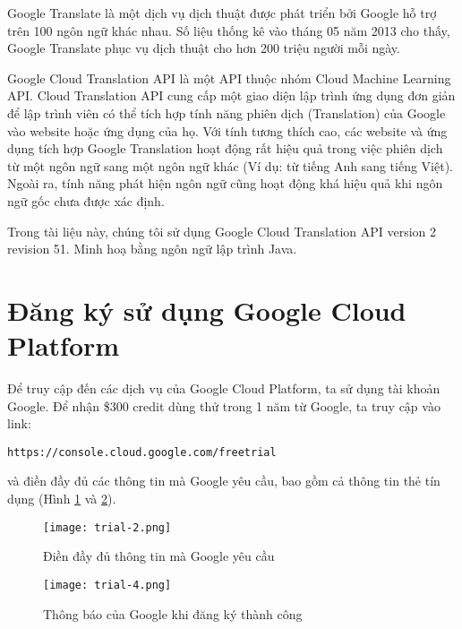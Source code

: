 \documentclass[../thesis.tex]{subfiles}
\begin{document}

Google Translate là một dịch vụ dịch thuật được phát triển bởi Google hỗ trợ trên 100 ngôn ngữ khác nhau. Số liệu thống kê vào tháng 05 năm 2013 cho thấy, Google Translate phục vụ dịch thuật cho hơn 200 triệu người mỗi ngày.

Google Cloud Translation API là một API thuộc nhóm Cloud Machine Learning API. Cloud Translation API cung cấp một giao diện lập trình ứng dụng đơn giản để lập trình viên có thể tích hợp tính năng phiên dịch (Translation) của Google vào website hoặc ứng dụng của họ. Với tính tương thích cao, các website và ứng dụng tích hợp Google Translation hoạt động rất hiệu quả trong việc phiên dịch từ một ngôn ngữ sang một ngôn ngữ khác (Ví dụ: từ tiếng Anh sang tiếng Việt). Ngoài ra, tính năng phát hiện ngôn ngữ cũng hoạt động khá hiệu quả khi ngôn ngữ gốc chưa được xác định.

Trong tài liệu này, chúng tôi sử dụng Google Cloud Translation API version 2 revision 51. Minh hoạ bằng ngôn ngữ lập trình Java. 

\section{Đăng ký sử dụng Google Cloud Platform}

Để truy cập đến các dịch vụ của Google Cloud Platform, ta sử dụng tài khoản Google. Để nhận \$300 credit dùng thử trong 1 năm từ Google, ta truy cập vào link:
\begin{lstlisting}[style=link]
https://console.cloud.google.com/freetrial
\end{lstlisting}
và điền đầy đủ các thông tin mà Google yêu cầu, bao gồm cả thông tin thẻ tín dụng (Hình \ref{Dien day du thong tin ma Google yeu cau} và \ref{Thong bao cua Google khi dang ky thanh cong}).

\begin{figure}
	\texttt{[image: trial-2.png]}
	\caption{Điền đầy đủ thông tin mà Google yêu cầu}
	\label{Dien day du thong tin ma Google yeu cau}
\end{figure}

\begin{figure}
	\texttt{[image: trial-4.png]}
	\caption{Thông báo của Google khi đăng ký thành công}
	\label{Thong bao cua Google khi dang ky thanh cong}
\end{figure}
\end{document}
